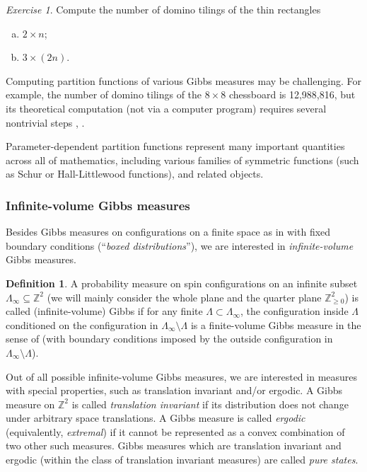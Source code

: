 \documentclass[letterpaper,11pt,oneside,reqno]{article}
\numberwithin{equation}{section}
\theoremstyle{definition}
\newtheorem{definition}[proposition]{Definition}
\theoremstyle{remark}
\newtheorem{exercise}{Exercise}[section]
\begin{document}
\begin{exercise}
	Compute the number of domino tilings
	of the thin rectangles 
	\begin{enumerate}[(a)]
		\item $2\times n$;
		\item $3\times (2n)$.
	\end{enumerate}
\end{exercise}

Computing partition functions of various Gibbs measures
may be challenging. For example, the number of 
domino tilings of the $8\times 8$ chessboard is 12,988,816,
but its theoretical computation (not via a computer program)
requires several nontrivial steps \cite{Kasteleyn1961}, \cite{temperley1961dimer}. 

Parameter-dependent partition functions represent many important 
quantities across all of mathematics, including various
families of symmetric functions (such as Schur or Hall-Littlewood functions), and related objects.

\subsubsection{Infinite-volume Gibbs measures}

Besides Gibbs measures on configurations on a
finite space as in  with fixed boundary
conditions (``\emph{boxed distributions}''), we are 
interested
in \emph{infinite-volume} Gibbs measures. 

\begin{definition}
	\label{def:infinite_Gibbs}
	A probability measure on spin configurations on 
	an infinite subset $\Lambda_\infty\subseteq\mathbb{Z}^{2}$
	(we will mainly consider the whole plane and the quarter plane $\mathbb{Z}_{\ge0}^{2}$)
	is called (infinite-volume) Gibbs if for any finite $\Lambda\subset \Lambda_\infty$,
	the configuration inside $\Lambda$
	conditioned on the configuration in $\Lambda_\infty\setminus \Lambda$
	is a finite-volume Gibbs measure in the sense of 
	(with boundary conditions imposed by the outside configuration in $\Lambda_\infty\setminus \Lambda$).
\end{definition}

Out of all possible infinite-volume Gibbs measures, we are interested in measures with 
special properties, such as translation invariant and/or ergodic.
A Gibbs measure on $\mathbb{Z}^{2}$ is called \emph{translation invariant}
if its distribution does not change under arbitrary
space translations. 
A Gibbs measure is called \emph{ergodic} (equivalently, \emph{extremal})
if it cannot be represented as a convex combination of 
two other such measures.
Gibbs measures which are translation invariant
and ergodic (within the class of translation invariant measures)
are called \emph{pure states}.
\end{document}
